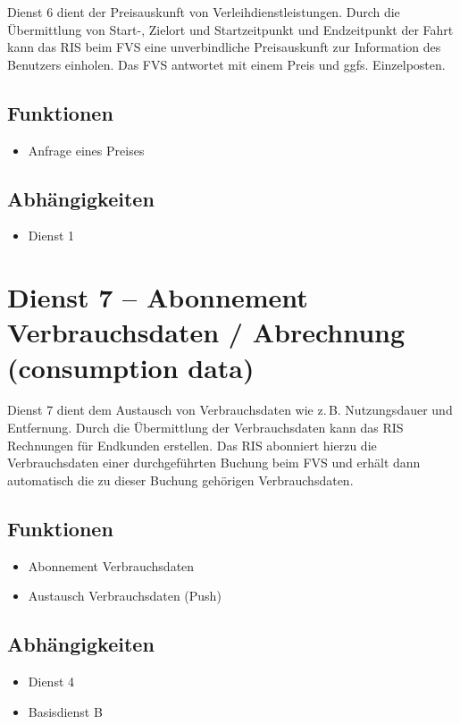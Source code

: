 Dienst 6 dient der Preisauskunft von Verleihdienstleistungen. Durch die Übermittlung von Start-, Zielort und Startzeitpunkt und Endzeitpunkt der Fahrt kann das RIS beim FVS eine unverbindliche Preisauskunft zur Information des Benutzers einholen. Das FVS antwortet mit einem Preis und ggfs. Einzelposten.

\subsection*{Funktionen}
\begin{itemize}
\item Anfrage eines Preises
\end{itemize}

\subsection*{Abhängigkeiten}
\begin{itemize}
\item Dienst 1
\end{itemize}


\section{Dienst 7 -- Abonnement Verbrauchsdaten / Abrechnung (consumption data)}
Dienst 7 dient dem Austausch von Verbrauchsdaten wie z.\,B. Nutzungsdauer und Entfernung. Durch die Übermittlung der Verbrauchsdaten kann das RIS Rechnungen für Endkunden erstellen. Das RIS abonniert hierzu die Verbrauchsdaten einer durchgeführten Buchung beim FVS und erhält dann automatisch die zu dieser Buchung gehörigen Verbrauchsdaten.

\subsection*{Funktionen}
\begin{itemize}
\item Abonnement Verbrauchsdaten
\item Austausch Verbrauchsdaten (Push)
\end{itemize}

\subsection*{Abhängigkeiten}
\begin{itemize}
\item Dienst 4
\item Basisdienst B
\end{itemize}

